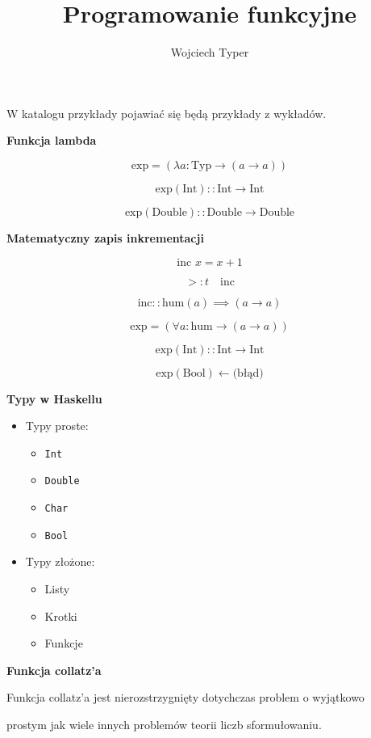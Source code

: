 \documentclass{article}
\title{Programowanie funkcyjne}
\author{Wojciech Typer}
\date{}
\begin{document}
\maketitle

W katalogu przykłady pojawiać się będą przykłady z wykładów. 

\vspace{1\baselineskip}

\textbf{Funkcja lambda} 

\[
\text{exp} = (\lambda a: \text{Typ} \rightarrow (a \rightarrow a))
\]

\[
\text{exp} (\text{Int}) :: \text{Int} \rightarrow \text{Int}
\]

\[
\text{exp} (\text{Double}) :: \text{Double} \rightarrow \text{Double}
\]

\vspace{1\baselineskip}

\textbf{Matematyczny zapis inkrementacji} 

\[
\text{inc } x = x + 1
\]

\[
>:t \quad \text{inc}
\]

\[
\text{inc} :: \text{hum}(a) \implies (a \rightarrow a)
\]

\[
\text{exp} = (\forall a: \text{hum} \rightarrow (a \rightarrow a))
\]

\[
\text{exp} (\text{Int}) :: \text{Int} \rightarrow \text{Int}
\]

\[
\text{exp} (\text{Bool}) \leftarrow \text{(błąd)}
\]

\vspace{15\baselineskip}

\textbf{Typy w Haskellu}

\vspace{1\baselineskip}

\begin{itemize}
    \item Typy proste:
    \begin{itemize}
        \item \texttt{Int}
        \item \texttt{Double}
        \item \texttt{Char}
        \item \texttt{Bool}
    \end{itemize}
    
    \item Typy złożone:
    \begin{itemize}
        \item Listy
        \item Krotki
        \item Funkcje
    \end{itemize}
\end{itemize}
\vspace{1\baselineskip}
\textbf{Funkcja collatz'a} \par
\vspace{1\baselineskip}
Funkcja collatz'a jest nierozstrzygnięty dotychczas problem o wyjątkowo  \par
prostym jak wiele innych problemów teorii liczb sformułowaniu.
\vspace{1\baselineskip}
\end{document}
